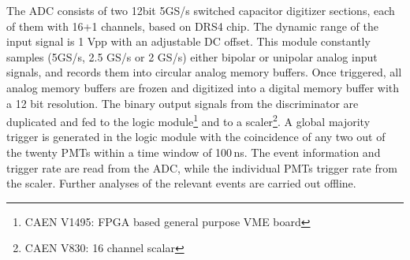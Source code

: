 The ADC consists of two 12bit 5GS/s switched capacitor digitizer sections, 
each of them with 16+1 channels, based on DRS4 chip. The dynamic range of the input signal is 1 
Vpp with an adjustable DC offset. This module constantly samples (5GS/s, 2.5 GS/s or 2 GS/s) either bipolar or unipolar analog input 
signals, and records them into circular 
analog memory buffers. Once triggered, all analog memory 
buffers are frozen and digitized into a digital memory buffer 
with a 12 bit resolution. The binary output signals from the discriminator are duplicated and fed to 
the logic module\footnote{CAEN V1495: FPGA based general purpose VME board} and to a scaler\footnote{CAEN V830: 16 channel scalar}. 
A global majority trigger is generated in the logic module with the coincidence of any two out of the twenty PMTs within a time window of 100\,ns. The event information and trigger rate are read from the ADC, while the individual PMTs trigger rate from the scaler. Further analyses of the relevant events are carried out offline.










